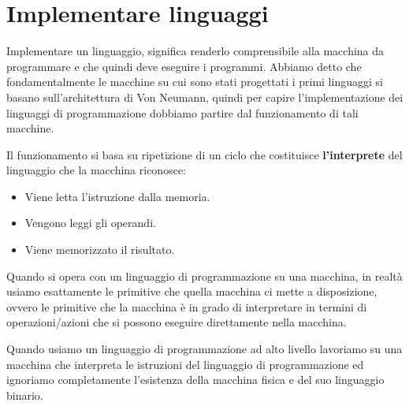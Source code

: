 \documentclass[oneside,a4paper,11pt]{book}
\theoremstyle{italicstyle}
\theoremstyle{normStyle}
\begin{document}
\section{Implementare linguaggi}
Implementare un linguaggio, significa renderlo comprensibile alla macchina 
da programmare e che quindi deve eseguire i programmi. Abbiamo detto 
che fondamentalmente le macchine su cui sono stati progettati i primi 
linguaggi si basano sull'architettura di Von Neumann, quindi per capire 
l'implementazione dei linguaggi di programmazione dobbiamo partire dal funzionamento 
di tali macchine.

Il funzionamento si basa su ripetizione di un ciclo che costituisce 
\textbf{l'interprete} del linguaggio che la macchina riconosce:
\begin{itemize}
  \item Viene letta l'istruzione dalla memoria.
  \item Vengono leggi gli operandi.
  \item Viene memorizzato il risultato.
\end{itemize}
Quando si opera con un linguaggio di programmazione su una macchina, 
in realtà usiamo esattamente le primitive che quella macchina ci mette a disposizione, ovvero 
le primitive che la macchina è in grado di interpretare in termini di operazioni/azioni 
che si possono eseguire direttamente nella macchina.

Quando usiamo un linguaggio di programmazione ad alto livello lavoriamo 
su una macchina che interpreta le istruzioni del linguaggio di programmazione 
ed ignoriamo completamente l'esistenza della macchina fisica e del suo linguaggio 
binario.
\end{document}
